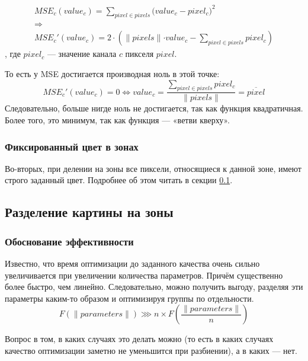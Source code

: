 \begin{equation}
    \begin{gathered}
        MSE_c(value_c) = \sum_{pixel \in {pixels}} \bigg(value_c - pixel_c\bigg)^2 \\
        \Rightarrow \\
        MSE_c'(value_c) = 2 \cdot \left( \lVert pixels \lVert \cdot value_c - \sum_{pixel \in {pixels}}  pixel_c \right)
    \end{gathered}
\end{equation}
, где $pixel_c$ — значение канала $c$ пикселя $pixel$.

То есть у MSE достигается производная ноль в этой точке:
\begin{equation}
    MSE_c'(value_c) = 0
    \Longleftrightarrow
    value_c = \frac{\sum_{pixel \in {pixels}}  pixel_c}{\lVert pixels \lVert} = \overline{pixel}
\end{equation}
Следовательно, больше нигде ноль не достигается, так как функция квадратичная.
Более того, это минимум, так как функция — «ветви кверху».

\subsubsection{Фиксированный цвет в зонах}
Во-вторых, при делении на зоны все пиксели, относящиеся к данной зоне, имеют строго заданный цвет.
Подробнее об этом читать в секции \ref{subsec:applying_zoning}.


\subsection{Разделение картины на зоны}\label{subsec:applying_zoning}

\subsubsection{Обоснование эффективности}\label{subsubsec:why_split_into_zones}
Известно, что время оптимизации до заданного качества очень сильно увеличивается при увеличении количества параметров.
Причём существенно более быстро, чем линейно.
Следовательно, можно получить выгоду, разделяя эти параметры каким-то образом и оптимизируя группы по отдельности.
\begin{equation}
    F(\lVert parameters \lVert) \ggg n \times F  \left( \frac{\lVert parameters \lVert}{n} \right)
\end{equation}

Вопрос в том, в каких случаях это делать можно (то есть в каких случаях качество оптимизации заметно не уменьшится при разбиении), а в каких — нет.

